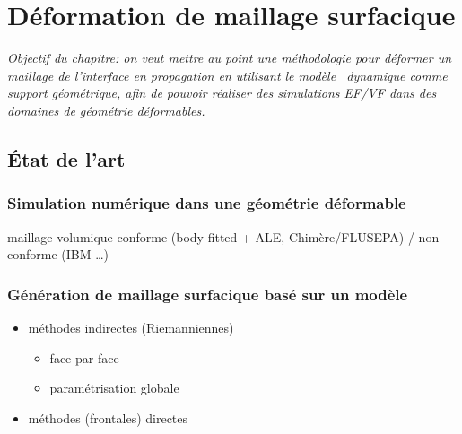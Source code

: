 \chapter{Déformation de maillage surfacique}

\textit{Objectif du chapitre: on veut mettre au point une méthodologie pour déformer un maillage de l'interface en propagation en utilisant le modèle \brep\ dynamique comme support géométrique, afin de pouvoir réaliser des simulations EF/VF dans des domaines de géométrie déformables.}


\section{État de l'art}
\subsection{Simulation numérique dans une géométrie déformable}
maillage volumique conforme (body-fitted + ALE, Chimère/FLUSEPA) / non-conforme (IBM \ldots)\\

\subsection{Génération de maillage surfacique basé sur un modèle \brep}
\begin{itemize}
	\item méthodes indirectes (\ie Riemanniennes)
	\begin{itemize}
		\item face par face \cite{borouchaki2000}
		\item paramétrisation globale \cite{marcum1999, noel2002, jones2004}
	\end{itemize}
	\item méthodes (frontales) directes \cite{foucault2013}
\end{itemize}

